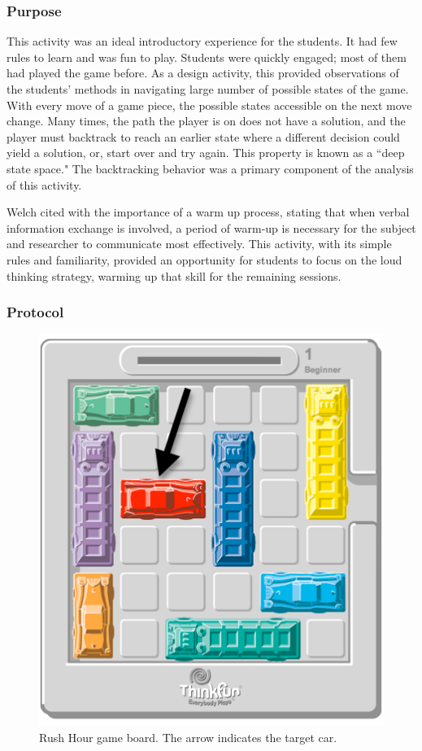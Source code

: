 	\subsubsection{Purpose}
	
	This activity was an ideal introductory experience for the students. It had few rules to learn and was fun to play. Students were quickly engaged; most of them had played the game before. As a design activity, this provided observations of the students' methods in navigating large number of possible states of the game. With every move of a game piece, the possible states accessible on the next move change. Many times, the path the player is on does not have a solution, and the player must backtrack to reach an earlier state where a different decision could yield a solution, or, start over and try again. This property is known as a ``deep state space." The backtracking behavior was a primary component of the analysis of this activity.
	
	Welch cited \citet{ericsson-1984} with the importance of a warm up process, stating that when verbal information exchange is involved, a period of warm-up is necessary for the subject and researcher to communicate most effectively. This activity, with its simple rules and familiarity, provided an opportunity for students to focus on the loud thinking strategy, warming up that skill for the remaining sessions.
	
	\subsubsection{Protocol}
	
	\begin{figure}
	\begin{centering}
	\includegraphics[height=0.35\textheight]{images/rushour-2}
	\par\end{centering}
	\caption[Rush Hour game board.]{Rush Hour game board. The arrow indicates the target car.}
	\label{fig:rushhourgame}
	\end{figure}
	
